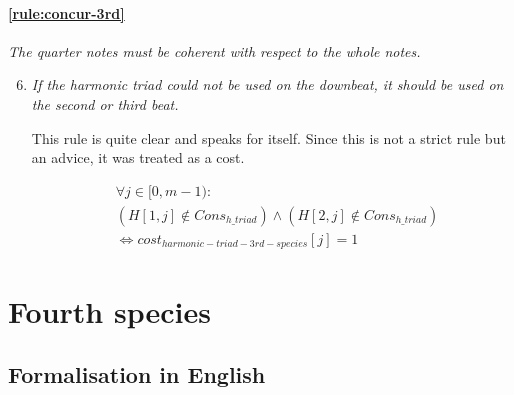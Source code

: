 \paragraph{\hspace{.5cm}\ref{rule:concur-3rd}} \textit{The quarter notes must be coherent with respect to the whole notes.}
\begin{enumerate}[wide, label=\bfseries 3.H\arabic*]
\setcounter{enumi}{5}
    \item \textit{If the harmonic triad could not be used on the downbeat, it should be used on the second or third beat.} \label{constraint:coherent}    

    This rule is quite clear and speaks for itself. Since this is not a strict rule but an advice, it was treated as a cost.

    \begin{equation} \begin{aligned}
            &\forall j \in [0, m-1) \colon \\
            &(H[1, j] \notin Cons_{h\_triad}) \land  (H[2, j] \notin Cons_{h\_triad})\\
            &\iff cost_{harmonic-triad-3rd-species}[j] = 1       
    \end{aligned} \end{equation}
\end{enumerate}




\section{Fourth species}
\subsection{Formalisation in English}\label{formalisation-en-4th}

